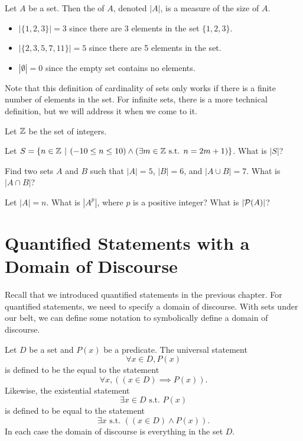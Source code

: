 \begin{definition}
    Let $A$ be a set. Then the  of $A$, denoted $|A|$, is a measure of the size of $A$.
\end{definition}

\begin{example}
    \begin{itemize}[leftmargin=*]
        \item $|\{1, 2, 3\}| = 3$ since there are 3 elements in the set $\{1, 2, 3\}$.
        \item $|\{2, 3, 5, 7, 11\}| = 5$ since there are 5 elements in the set.
        \item $|\emptyset| = 0$ since the empty set contains no elements.
    \end{itemize}
\end{example}

Note that this definition of cardinality of sets only works if there is a finite number of elements in the set. For infinite sets, there is a more technical definition, but we will address it when we come to it.

\begin{exercise}
    Let $\mathbb{Z}$ be the set of integers.
    \begin{partquestions}{\alph*}
        \item Let $S = \{n \in \Z \vert (-10 \leq n \leq 10) \land (\exists m \in \Z \text{ s.t. } n=2m+1)\}$. What is $|S|$?
        \item Find two sets $A$ and $B$ such that $|A| = 5$, $|B| = 6$, and $|A \cup B| = 7$. What is $|A \cap B|$?
        \item Let $|A| = n$. What is $|A^p|$, where $p$ is a positive integer? What is $|{\mathcal{P}(A)}|$?
    \end{partquestions}
\end{exercise}

\section{Quantified Statements with a Domain of Discourse}
Recall that we introduced quantified statements in the previous chapter. For quantified statements, we need to specify a domain of discourse. With sets under our belt, we can define some notation to symbolically define a domain of discourse.

\begin{definition}
    Let $D$ be a set and $P(x)$ be a predicate. The universal statement
    \[
        \forall x \in D, P(x)
    \]
    is defined to be the equal to the statement
    \[
        \forall x, ((x \in D) \implies P(x)).
    \]
    Likewise, the existential statement
    \[
        \exists x \in D \text{ s.t. } P(x)
    \]
    is defined to be equal to the statement
    \[
        \exists x \text{ s.t. } ((x \in D) \land P(x)).
    \]
    In each case the domain of discourse is everything in the set $D$.
\end{definition}

